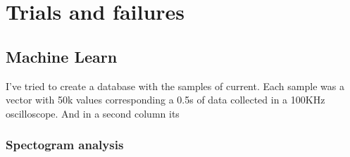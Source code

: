\chapter{Trials and failures}

\section{Machine Learn}

I've tried to create a database with the samples of current. Each sample was a vector with 50k values corresponding a 0.5s of data collected in a 100KHz oscilloscope. And in a second column its 



\subsection{Spectogram analysis}


